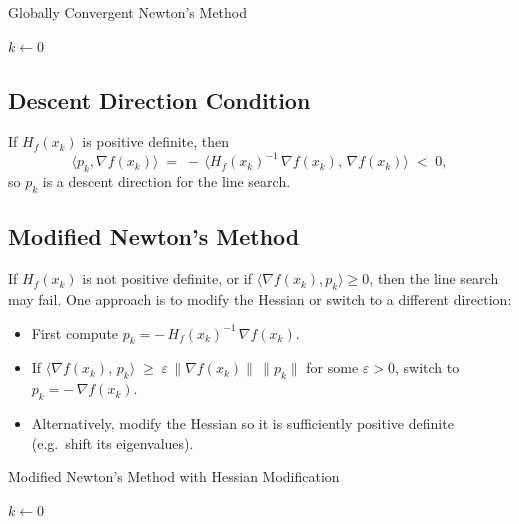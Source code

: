 \begin{algorithm}[H]
  \caption{Globally Convergent Newton's Method}
  \label{alg:newton-global}
  \(k \gets 0\)\;
  \;
\end{algorithm}

\subsection*{Descent Direction Condition}
If \(H_f(x_k)\) is positive definite, then
\[
  \langle p_k, \nabla f(x_k)\rangle
  \;=\;
  -\,\langle H_f(x_k)^{-1}\,\nabla f(x_k),\,\nabla f(x_k)\rangle
  \;<\; 0,
\]
so \(p_k\) is a descent direction for the line search.

\subsection*{Modified Newton's Method}
If \(H_f(x_k)\) is not positive definite, or if \(\langle \nabla f(x_k), p_k\rangle \geq 0\), then the line search may fail. One approach is to modify the Hessian or switch to a different direction:

\begin{itemize}
  \item First compute \(p_k = -\,H_f(x_k)^{-1}\,\nabla f(x_k)\).
  \item If \(\langle \nabla f(x_k),\,p_k\rangle \;\ge\; \varepsilon \,\|\nabla f(x_k)\|\,\|p_k\|\) for some \(\varepsilon > 0\), switch to \(p_k = -\,\nabla f(x_k)\).
  \item Alternatively, modify the Hessian so it is sufficiently positive definite (e.g.\ shift its eigenvalues).
\end{itemize}

\begin{algorithm}[H]
  \caption{Modified Newton's Method with Hessian Modification}
  \label{alg:newton-modified}
  \(k \gets 0\)\;
  \;
\end{algorithm}

